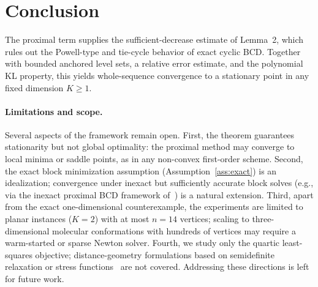 \documentclass[11pt]{article}
\begin{document}
\clearpage

\section{Conclusion}
\label{sec:conclusion}

The proximal term supplies the sufficient-decrease estimate of Lemma~2, which rules out the Powell-type and tie-cycle behavior of exact cyclic BCD.  Together with bounded anchored level sets, a relative error estimate, and the polynomial KL property, this yields whole-sequence convergence to a stationary point in any fixed dimension \(K\ge1\).

\paragraph{Limitations and scope.}
Several aspects of the framework remain open.  First, the theorem guarantees stationarity but not global optimality: the proximal method may converge to local minima or saddle points, as in any non-convex first-order scheme.  Second, the exact block minimization assumption (Assumption~\ref{ass:exact}) is an idealization; convergence under inexact but sufficiently accurate block solves (e.g., via the inexact proximal BCD framework of~\cite{tseng2001convergence}) is a natural extension.  Third, apart from the exact one-dimensional counterexample, the experiments are limited to planar instances ($K=2$) with at most $n=14$ vertices; scaling to three-dimensional molecular conformations with hundreds of vertices may require a warm-started or sparse Newton solver.  Fourth, we study only the quartic least-squares objective; distance-geometry formulations based on semidefinite relaxation or stress functions~\cite{more1999} are not covered.  Addressing these directions is left for future work.



\end{document}
